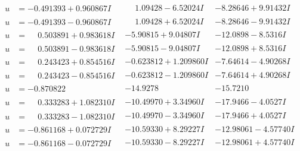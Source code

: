 \documentclass[1p]{elsarticle_modified}
\theoremstyle{definition}
\begin{document}
$$\begin{array}{c|c|c}
\begin{aligned}
u &= -0.491393 + 0.960867 I\end{aligned}
 & \phantom{-}1.09428 - 6.52024 I & -8.28646 + 9.91432 I \\ \hline\begin{aligned}
u &= -0.491393 - 0.960867 I\end{aligned}
 & \phantom{-}1.09428 + 6.52024 I & -8.28646 - 9.91432 I \\ \hline\begin{aligned}
u &= \phantom{-}0.503891 + 0.983618 I\end{aligned}
 & -5.90815 + 9.04807 I & -12.0898 - 8.5316 I \\ \hline\begin{aligned}
u &= \phantom{-}0.503891 - 0.983618 I\end{aligned}
 & -5.90815 - 9.04807 I & -12.0898 + 8.5316 I \\ \hline\begin{aligned}
u &= \phantom{-}0.243423 + 0.854516 I\end{aligned}
 & -0.623812 + 1.209860 I & -7.64614 - 4.90268 I \\ \hline\begin{aligned}
u &= \phantom{-}0.243423 - 0.854516 I\end{aligned}
 & -0.623812 - 1.209860 I & -7.64614 + 4.90268 I \\ \hline\begin{aligned}
u &= -0.870822\phantom{ +0.000000I}\end{aligned}
 & -14.9278\phantom{ +0.000000I} & -15.7210\phantom{ +0.000000I} \\ \hline\begin{aligned}
u &= \phantom{-}0.333283 + 1.082310 I\end{aligned}
 & -10.49970 + 3.34960 I & -17.9466 - 4.0527 I \\ \hline\begin{aligned}
u &= \phantom{-}0.333283 - 1.082310 I\end{aligned}
 & -10.49970 - 3.34960 I & -17.9466 + 4.0527 I \\ \hline\begin{aligned}
u &= -0.861168 + 0.072729 I\end{aligned}
 & -10.59330 + 8.29227 I & -12.98061 - 4.57740 I \\ \hline\begin{aligned}
u &= -0.861168 - 0.072729 I\end{aligned}
 & -10.59330 - 8.29227 I & -12.98061 + 4.57740 I \\ \hline\begin{aligned}

\end{aligned}
\end{array}$$
\end{document}
